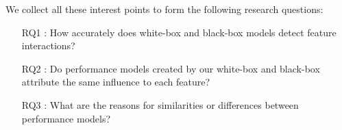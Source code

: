 We collect all these interest points to form the following research questions:

\begin{itemize}\label{researchQuestions}
\item[RQ1]: How accurately does white-box and black-box models detect feature interactions? 
\item[RQ2]: Do performance models created by our white-box and black-box attribute the same influence to each feature?
\item[RQ3]: What are the reasons for similarities or differences between performance models?
\end{itemize}
